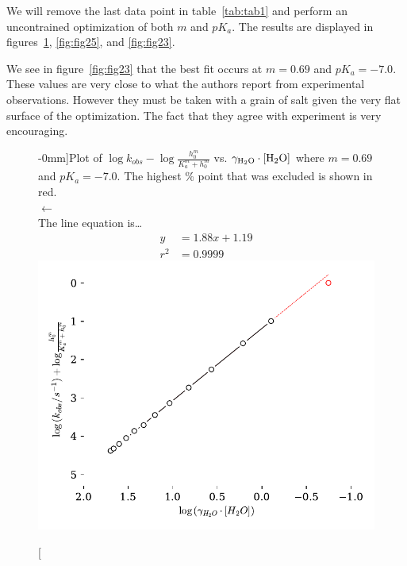 \documentclass[]{tufte-handout}
\begin{document}
We will remove the last data point in table~\vref{tab:tab1} and perform an uncontrained optimization of both $m$ and $pK_a$. The results are displayed in figures~\ref{fig:fig24}, \ref{fig:fig25}, and \vref{fig:fig23}.


We see in figure~\ref{fig:fig23} that the best fit occurs at $m = 0.69$ and $pK_a = -7.0$. These values are very close to what the authors report from ex\-per\-imental observations. However they must be taken with a grain of salt given the very flat surface of the optimization. The fact that they agree with experiment is very encouraging.


\begin{figure}[h!]
  \centering
  \caption[][-0mm]{Plot of $\log{k_{obs}}-\log{\frac{h_0^m}{K_a^m + h_0^m}}$ vs. $\gamma_{\ce{H2O}} \cdot [\ce{H2O}]$ where $m = 0.69$ and $pK_a = -7.0$. The highest \% point that was excluded is shown in red.\\ $\longleftarrow$ \\ The line equation is\ldots \begin{align*}y &= 1.88x+1.19 \\ r^2 &= 0.9999\end{align*}} 
  \includegraphics[scale=0.7]{images/fig24}
  \label{fig:fig24}
\end{figure}
\end{document}
